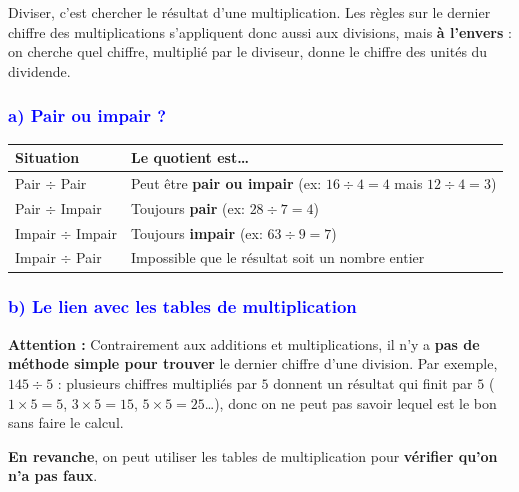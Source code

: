 \documentclass{exam}
\begin{document}
Diviser, c'est chercher le résultat d'une multiplication. Les règles sur le dernier chiffre des multiplications s'appliquent donc aussi aux divisions, mais \textbf{à l'envers} : on cherche quel chiffre, multiplié par le diviseur, donne le chiffre des unités du dividende.

\subsubsection*{\textcolor{blue}{a) Pair ou impair ?}}

\begin{center}
\renewcommand{\arraystretch}{1.5}
\begin{tabular}{|l|l|}
\hline
\rowcolor{gray!20}
\textbf{Situation} & \textbf{Le quotient est\ldots} \\
\hline
Pair $\div$ Pair & Peut être \textbf{pair ou impair} \quad (ex: $16 \div 4 = 4$ mais $12 \div 4 = 3$) \\
\hline
Pair $\div$ Impair & Toujours \textbf{pair} \quad (ex: $28 \div 7 = 4$) \\
\hline
Impair $\div$ Impair & Toujours \textbf{impair} \quad (ex: $63 \div 9 = 7$) \\
\hline
Impair $\div$ Pair & Impossible que le résultat soit un nombre entier \\
\hline
\end{tabular}
\end{center}

\subsubsection*{\textcolor{blue}{b) Le lien avec les tables de multiplication}}

\begin{tcolorbox}[colback=red!8, colframe=red!70, boxrule=0.5mm, arc=3mm]
\textbf{Attention :} Contrairement aux additions et multiplications, il n'y a \textbf{pas de méthode simple pour trouver} le dernier chiffre d'une division. Par exemple, $145 \div 5$ : plusieurs chiffres multipliés par $5$ donnent un résultat qui finit par $5$ ($1 \times 5 = 5$, $3 \times 5 = 15$, $5 \times 5 = 25$\ldots), donc on ne peut pas savoir lequel est le bon sans faire le calcul.

\vspace{0.3em}
\textbf{En revanche}, on peut utiliser les tables de multiplication pour \textbf{vérifier qu'on n'a pas faux}.
\end{tcolorbox}
\end{document}
